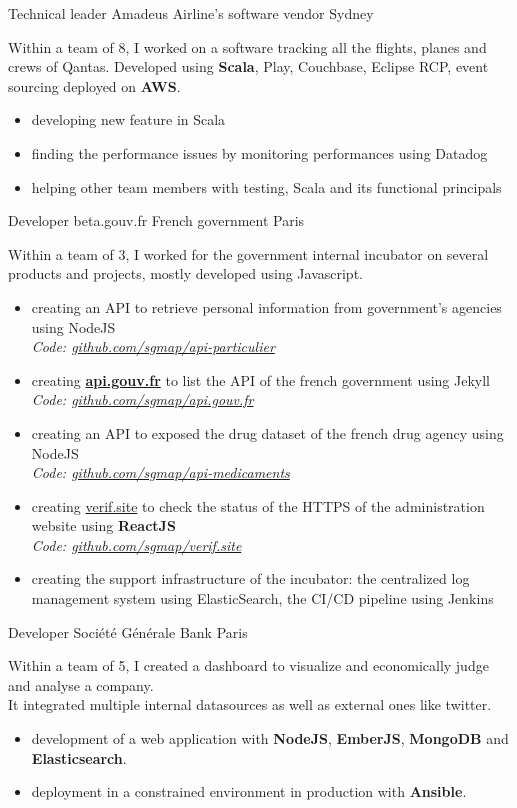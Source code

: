 \documentclass[11pt,a4paper]{moderncv}
\begin{document}
{Technical leader}
{Amadeus}
{Airline's software vendor}
{Sydney}
{
Within a team of 8, I worked on a software tracking all the flights, planes and crews of Qantas. Developed using \textbf{Scala}, Play, Couchbase, Eclipse RCP, event sourcing deployed on \textbf{AWS}.
\begin{itemize}
\item developing new feature in Scala
\item finding the performance issues by monitoring performances using Datadog
\item helping other team members with testing, Scala and its functional principals
\end{itemize}
\vspace{5mm}
}

{Developer}
{beta.gouv.fr}
{French government}
{Paris}
{
Within a team of 3, I worked for the government internal incubator on several products and projects, mostly developed using Javascript.
\begin{itemize}
\item creating an API to retrieve personal information from  government's agencies using NodeJS
\\
\textit{Code: \url{github.com/sgmap/api-particulier}}
\item creating \textbf{\url{api.gouv.fr}} to list the API of the french government using Jekyll
\\
\textit{Code: \url{github.com/sgmap/api.gouv.fr}}
\item creating an API to exposed the drug dataset of the french drug agency using NodeJS
\\
\textit{Code: \url{github.com/sgmap/api-medicaments}}
\item creating \url{verif.site} to check the status of the HTTPS of the administration website using \textbf{ReactJS}
\\
\textit{Code: \url{github.com/sgmap/verif.site}}
\item creating the support infrastructure of the incubator: the centralized log management system using ElasticSearch, the CI/CD pipeline using Jenkins
\end{itemize}
\vspace{5mm}
}

{Developer}
{Société Générale}
{Bank}
{Paris}
{
Within a team of 5, I created a dashboard to visualize and economically judge and analyse a company.\\
It integrated multiple internal datasources as well as external ones like twitter.
\begin{itemize}
\item development of a web application with \textbf{NodeJS}, \textbf{EmberJS}, \textbf{MongoDB} and \textbf{Elasticsearch}.
\item deployment in a constrained environment in production with \textbf{Ansible}.
\end{itemize}
\vspace{5mm}
}
\end{document}
